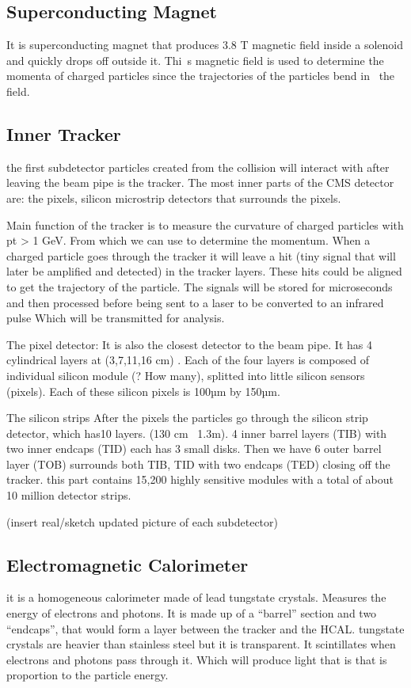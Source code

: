 \subsection{Superconducting Magnet}
It is superconducting magnet that produces 3.8 T magnetic field inside a solenoid and quickly drops off outside it. Thi\
s magnetic field is used to determine the momenta of charged particles since the trajectories of the particles bend in \
the field.

\subsection{Inner Tracker}
the first subdetector particles created from the collision will interact with after leaving the beam pipe is the tracker. The most inner parts of the CMS detector are: the pixels, silicon microstrip detectors that surrounds the pixels.

Main function of the tracker is to measure the curvature of charged particles with pt > 1 GeV. From which we can use to determine the momentum. When a charged particle goes through the tracker it will leave a hit (tiny signal that will later be amplified and detected) in the tracker layers. These hits could be aligned to get the trajectory of the particle. The signals will be stored for microseconds and then processed before being sent to a laser to be converted to an infrared pulse Which will be transmitted for analysis.

The pixel detector:
It is also the closest detector to the beam pipe. It has 4 cylindrical layers at (3,7,11,16 cm) . Each of the four layers is composed of individual silicon module (? How many), splitted into little silicon sensors (pixels).  Each of these silicon pixels is 100µm by 150µm.

The silicon strips
After the pixels the particles go through the silicon strip detector, which has10 layers. (130 cm~ 1.3m). 4 inner barrel layers (TIB) with two inner endcaps (TID) each has 3 small disks. Then we have 6 outer barrel layer (TOB) surrounds both TIB, TID with two endcaps (TED) closing off the tracker. this part contains 15,200 highly sensitive modules with a total of about 10 million detector strips.

(insert real/sketch updated picture of each subdetector)


\subsection{Electromagnetic Calorimeter}
it is a homogeneous calorimeter made of lead tungstate crystals. Measures the energy of electrons and photons. It is made up of a “barrel” section and two “endcaps”, that would form a layer between the tracker and the HCAL.
tungstate crystals are heavier than stainless steel but it is transparent. It scintillates when electrons and photons pass through it. Which will produce light that is that is proportion to the particle energy.


